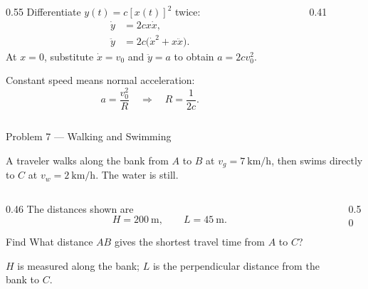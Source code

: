 \begin{solutionframe}
  \small
  \begin{columns}[T,onlytextwidth]
    \begin{column}{0.55\textwidth}
      Differentiate $y(t)=c[x(t)]^2$ twice:
      \[
        \begin{aligned}
          \dot y&=2cx\dot x,\\
          \ddot y&=2c\bigl(\dot x^2+x\ddot x\bigr).
        \end{aligned}
      \]
      At $x=0$, substitute $\dot x=v_0$ and $\ddot y=a$ to obtain
      $a=2cv_0^2$.

      Constant speed means normal acceleration:
      \[
        a=\frac{v_0^2}{R}
        \quad\Longrightarrow\quad R=\frac{1}{2c}.
      \]
    \end{column}
    \begin{column}{0.41\textwidth}
      \centering
      \resizebox{!}{0.40\paperheight}{}
    \end{column}
  \end{columns}
\end{solutionframe}

\begin{frame}{Problem 7 — Walking and Swimming}
  \par
  \small
  A traveler walks along the bank from $A$ to $B$ at
  $v_g=\SI{7}{\kilo\metre\per\hour}$, then swims directly to $C$
  at $v_w=\SI{2}{\kilo\metre\per\hour}$. The water is still.
  \begin{columns}[T,onlytextwidth]
    \begin{column}{0.46\textwidth}
      The distances shown are
      \[
        H=\SI{200}{\metre},\qquad L=\SI{45}{\metre}.
      \]
      \begin{block}{Find}
        What distance $AB$ gives the shortest travel time from $A$ to $C$?
      \end{block}
      \footnotesize
      $H$ is measured along the bank; $L$ is the perpendicular distance
      from the bank to $C$.
    \end{column}
    \begin{column}{0.50\textwidth}
      \centering
      \resizebox{!}{0.38\paperheight}{}
    \end{column}
  \end{columns}
\end{frame}

